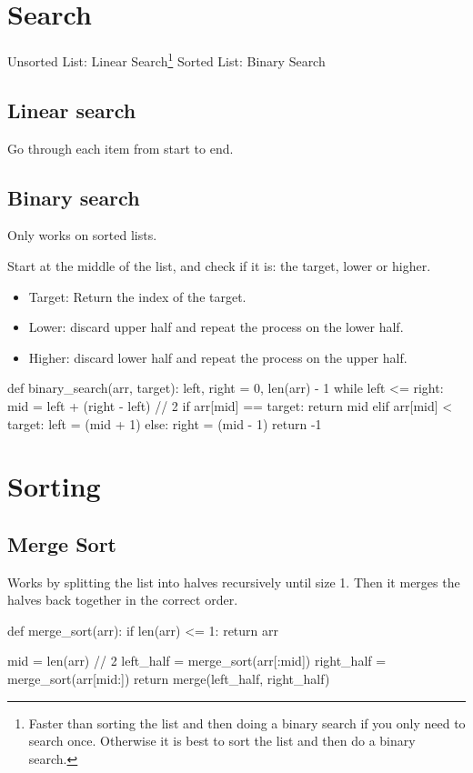 \section{Search}
Unsorted List: Linear Search\footnote{Faster than sorting the list and then doing a binary search if you only need to search once. Otherwise it is best to sort the list and then do a binary search.}
\hfill
Sorted List: Binary Search

\subsection{Linear search}
Go through each item from start to end.

\subsection{Binary search}
Only works on sorted lists.

Start at the middle of the list, and check if it is: the target, lower or higher.
\begin{itemize}
    \setlength\itemsep{0em}
    \item Target: Return the index of the target.
    \item Lower: discard upper half and repeat the process on the lower half.
    \item Higher: discard lower half and repeat the process on the upper half.
\end{itemize}


\begin{python}
def binary_search(arr, target):
    left, right = 0, len(arr) - 1
    while left <= right:
        mid = left + (right - left) // 2
        if arr[mid] == target:
            return mid
        elif arr[mid] < target:
            left = (mid + 1)
        else:
            right = (mid - 1)
    return -1
\end{python}

\section{Sorting}

\subsection{Merge Sort}
Works by splitting the list into halves recursively until size 1.
Then it merges the halves back together in the correct order.


\begin{python}
def merge_sort(arr):
    if len(arr) <= 1:
        return arr
    
    mid = len(arr) // 2
    left_half = merge_sort(arr[:mid])
    right_half = merge_sort(arr[mid:])
    return merge(left_half, right_half)
\end{python}